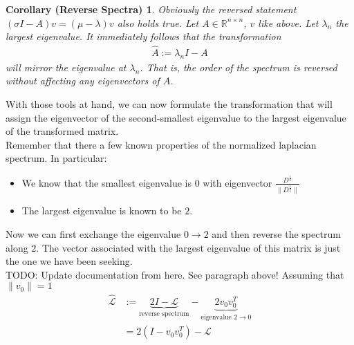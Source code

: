 \documentclass[10pt, a4paper, twocolumn]{article} %
\begin{document}
    \newtheorem{Reversal}[]{Corollary (Reverse Spectra)}[section]
    \begin{Reversal}
        Obviously the reversed statement $(\sigma I - A)v = (\mu - \lambda)v$ also holds true.
        Let $A \in \mathbb{R}^{n \times n}$, $v$ like above. Let $\lambda_n$ the largest eigenvalue.
        It immediately follows that the transformation
        \begin{align}
            \hat{A} := \lambda_n I - A
        \end{align}
        will mirror the eigenvalue at $\lambda_n$. That is, the order of the spectrum is reversed without affecting any eigenvectors of $A$.
    \end{Reversal}
    With those tools at hand, we can now formulate the transformation that will assign the eigenvector of the
    second-smallest eigenvalue to the largest eigenvalue of the transformed matrix.
    \\
    Remember that there a few known properties of the normalized laplacian spectrum. In particular:
    \begin{itemize}
        \item We know that the smallest eigenvalue is $0$ with eigenvector $\frac{D^\frac{1}{2}}{\lVert D^\frac{1}{2} \rVert}$ %
        \item The largest eigenvalue is known to be $2$.
    \end{itemize}

    Now we can first exchange the eigenvalue $0 \rightarrow 2$ and then reverse the spectrum along $2$.
    The vector associated with the largest eigenvalue of this matrix is just the one we have been seeking.
    \\
    TODO: Update documentation from here. See paragraph above!
    Assuming that $\lVert v_0 \lVert = 1$
    \begin{equation}
        \label{shiftedlaplacian}
        \begin{split}
            \hat{\mathcal{L}} & := \underbrace{2I - \mathcal{L}}_{\text{reverse spectrum}} - \underbrace{2 v_0 v_0^T}_{\text{eigenvalue $2 \rightarrow 0$}}\\
            & = 2 ( I - v_0 v_0^T ) - \mathcal{L}
        \end{split}
    \end{equation}
\end{document}
